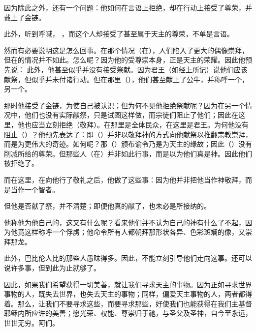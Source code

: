 因为除此之外，还有一个问题：他如何在言语上拒绝，却在行动上接受了尊荣，并戴上了金链。\par

此外，听到呼喊， ，而这个人却接受了甚至属于天主的尊荣，不单是言语。\par

然而有必要说明这是怎么回事。在那个情况（在），人们陷入了更大的偶像崇拜，但在的情况并不如此。怎么呢？因为他的受尊崇本身，正是天主的荣耀。因此他预先说：  此外，他甚至似乎并没有接受祭献。因为君王（如经上所记）说他们应该献祭，但似乎并未付诸行动。但在那里（），他们甚至献上了公牛，并称呼一个，另一个。\par

那时他接受了金链，为使自己被认识；但为何不见他拒绝祭献呢？因为在另一个情况中，他们也没有实际献祭，只是试图这样做，而宗徒们阻止了他们；因此在这里，他也应当立刻拒绝（敬拜）。在那里是全体民众，在这里是君王。为何他没有阻止（）？他预先表达了：即（）并非以敬拜神的方式向他献祭以推翻宗教崇拜，而是为更伟大的奇迹。如何呢？那（）颁布谕令乃是为天主的缘故；因此（）没有削减所给的尊荣。但那些人（在）并非如此行事，而是以为他们真是神。因此他们被拒绝了。\par

而在这里，在向他行了敬礼之后，他做了这些事：因为他并非把他当作神敬拜，而是当作一个智者。\par

但他是否献了祭，并不清楚；即便他真的献了，也未必是所接纳的。\par

他称他为他自己的，这又有什么呢？看来他们并不认为自己的神有什么了不起，因为他竟这样称呼一个俘虏；他命令所有人都朝拜那形状各异、色彩斑斓的像，又崇拜那龙。\par

此外，巴比伦人比的那些人愚昧得多。因此，不能立刻引导他们走向这事。还可以说许多事，但到此为止就够了。\par

因此，如果我们希望获得一切美善，就让我们寻求天主的事物。因为正如寻求世界事物的人，既失去世界，也失去天主的事物；同样，偏爱天主事物的人，两者都得着。那么，让我们不要寻求这些，而要寻求那些，好使我们也能获得在我们主基督耶稣内所应许的美善；愿光荣、权能、尊崇归于祂，与圣父及圣神，自今至永远，世世无穷。阿们。\par

